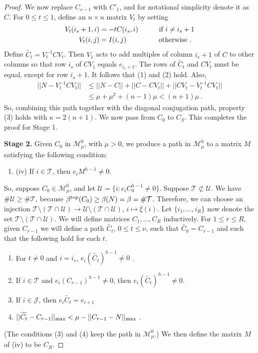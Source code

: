 \documentclass{amsart}
\theoremstyle{definition}
\theoremstyle{remark}
\numberwithin{equation}{section}
\begin{document}
{{\begin{proof}
We now replace $C_{s-1}$ with $C'_1$, and for notational simplicity denote it 
as $C$.  
For $0\leq t\leq 1$, define an $n\times n$ matrix 
$V_t$ by setting 
\begin{align*} 
V_t(i_s+1,i) & = -tC(i_s,i) \quad \qquad \textnormal{if } i\neq i_s+1 \\ 
V_t(i,j) &= I(i,j) \ \  \qquad  \qquad \textnormal{otherwise }. 
\end{align*} 
Define $\widetilde{C_t}=V_t^{-1}CV_t$. 
Then $V_1$ acts to add multiples of column $i_{s}+1 $ of $C$ to other columns so that 
row $i_s$ of $CV_1$ equals $e_{i_s+1}$. 
The rows of $\widetilde{C_t}$ and $CV_t$ must be equal, except for row $i_s+1$. It 
follows that (1) and (2) hold. 
Also, 
\begin{align*} 
||N-V_t^{-1}CV_t || & \leq
||N-C || + 
||C-CV_t || + 
||CV_t -V_t^{-1}CV_t || \\ 
&\leq \mu + \mu^2 + (n-1)\mu < (n+1)\mu \ . 
\end{align*}  
So, combining this path together with the
diagonal conjugation path, property (3) holds with $\kappa = 2(n+1)$. 
We now pass from $C_0$ to $C_S$. This completes the proof 
for Stage 1.

{\bf Stage 2.} Given $C_0$ in 
$\mathcal M_{\mu}^0$, with $\mu>0$,
we produce 
a path in $\mathcal M_{\mu}^0$  to a matrix $M$  satisfying the following 
condition: 
\begin{enumerate}
\item[]
(iv) If $ i\in \mathcal T$, then  
$e_iM^{h-1}\neq 0$. 
\end{enumerate} 

So, suppose $C_0\in \mathcal M^0_{\mu}$, and  
let $\mathcal U=\{i: e_iC_0^{h-1}\neq 0\}$.
Suppose $\mathcal T \not\subset\mathcal U $. 
We have $\# \mathcal U \geq \# \mathcal T $, because 
$\beta^{\textnormal{top}}(C_0)\geq \beta (N) = \beta= \# \mathcal T$.
Therefore, we can choose an injection 
$\mathcal T \setminus (\mathcal T \cap \mathcal U)\to 
\mathcal U \setminus (\mathcal T \cap \mathcal U)$, $i\mapsto \xi (i)$. 
Let  $\{i_1, \dots , i_R\}$ now denote the set 
$\mathcal T \setminus (\mathcal T \cap \mathcal U)$.
We will define matrices $C_1, \dots , C_R$ inductively. 
For $1\leq r \leq R$, given $C_{r-1}$ 
we will
define  a path $\widetilde{C_t}$, $0\leq t \leq \nu$, such that 
$\widetilde{C_0}=C_{r-1}$ and 
such that the following hold for each $t$. 
\begin{enumerate} 
\item For $t\neq 0$ and $i=i_r$,  $e_i(\widetilde{C_t})^{h-1} \neq 0$ . 
\item 
If $i \in \mathcal T$ 
and $e_i(C_{r-1})^{h-1} \neq 0$, then 
$e_i(\widetilde{C_t})^{h-1} \neq 0$. 
\item 
If $i\in \mathcal J$, then $e_i\widetilde{C_t}=e_{i+1}$
\item 
$||\widetilde{C_t} -C_{r-1}||_{\textnormal{max}} < \mu - 
||C_{r-1}-N||_{\textnormal{max}}$ . 
\end{enumerate} 
(The conditions (3) and (4) keep the path in 
$\mathcal M^0_{\mu}$.)  
We then define the matrix $M$ of (iv) to be $C_R$. 


\end{proof}}}
\end{document}
